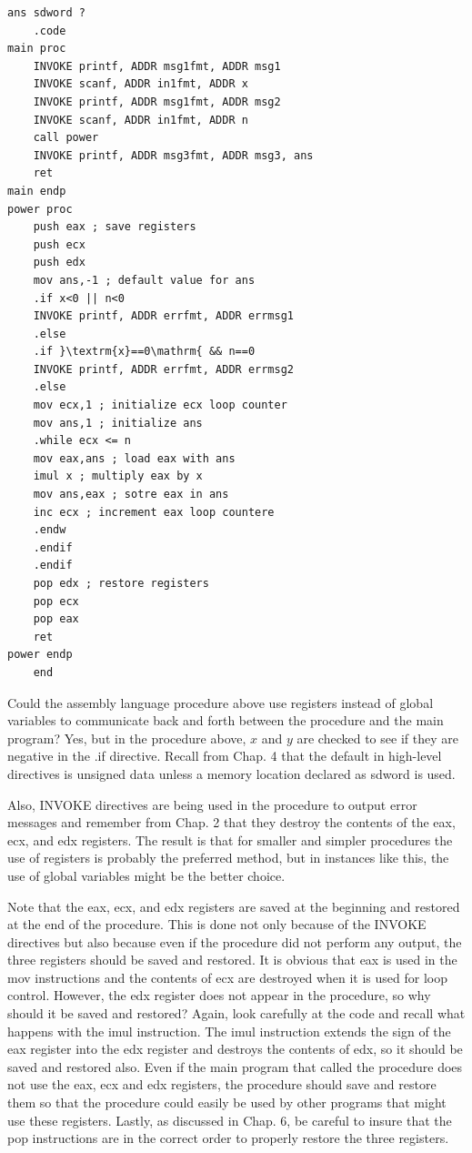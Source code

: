 \documentclass[10pt]{book}
\begin{document}
\begin{verbatim}
ans sdword ?
    .code
main proc
    INVOKE printf, ADDR msg1fmt, ADDR msg1
    INVOKE scanf, ADDR in1fmt, ADDR x
    INVOKE printf, ADDR msg1fmt, ADDR msg2
    INVOKE scanf, ADDR in1fmt, ADDR n
    call power
    INVOKE printf, ADDR msg3fmt, ADDR msg3, ans
    ret
main endp
power proc
    push eax ; save registers
    push ecx
    push edx
    mov ans,-1 ; default value for ans
    .if x<0 || n<0
    INVOKE printf, ADDR errfmt, ADDR errmsg1
    .else
    .if }\textrm{x}==0\mathrm{ && n==0
    INVOKE printf, ADDR errfmt, ADDR errmsg2
    .else
    mov ecx,1 ; initialize ecx loop counter
    mov ans,1 ; initialize ans
    .while ecx <= n
    mov eax,ans ; load eax with ans
    imul x ; multiply eax by x
    mov ans,eax ; sotre eax in ans
    inc ecx ; increment eax loop countere
    .endw
    .endif
    .endif
    pop edx ; restore registers
    pop ecx
    pop eax
    ret
power endp
    end
\end{verbatim}

Could the assembly language procedure above use registers instead of global variables to communicate back and forth between the procedure and the main program? Yes, but in the procedure above, $x$ and $y$ are checked to see if they are negative in the .if directive. Recall from Chap. 4 that the default in high-level directives is unsigned data unless a memory location declared as sdword is used.

Also, INVOKE directives are being used in the procedure to output error messages and remember from Chap. 2 that they destroy the contents of the eax, ecx, and edx registers. The result is that for smaller and simpler procedures the use of registers is probably the preferred method, but in instances like this, the use of global variables might be the better choice.

Note that the eax, ecx, and edx registers are saved at the beginning and restored at the end of the procedure. This is done not only because of the INVOKE directives but also because even if the procedure did not perform any output, the three registers should be saved and restored. It is obvious that eax is used in the mov instructions and the contents of ecx are destroyed when it is used for loop control. However, the edx register does not appear in the procedure, so why should it be saved and restored? Again, look carefully at the code and recall what happens with the imul instruction. The imul instruction extends the sign of the eax register into the edx register and destroys the contents of edx, so it should be saved and restored also. Even if the main program that called the procedure does not use the eax, ecx and edx registers, the procedure should save and restore them so that the procedure could easily be used by other programs that might use these registers. Lastly, as discussed in Chap. 6, be careful to insure that the pop instructions are in the correct order to properly restore the three registers.
\end{document}
